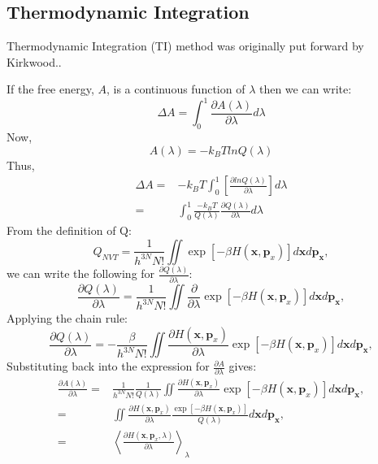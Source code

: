 \subsection{Thermodynamic Integration\label{Sec:FEM:TI}}
Thermodynamic Integration (TI) method was originally put forward by Kirkwood.\cite{KirkwoodJCP1935}. 
	
If the free energy, $A$, is a continuous function of $\lambda$ then we can write:
\begin{equation}
\Delta A = \int_{0}^{1} \frac{\partial{A(\lambda)}}{\partial{\lambda}} d\lambda
\label{Eq:deltaA1TI}
\end{equation} 
Now,
\begin{equation}
A(\lambda) = -k_{B}TlnQ(\lambda)
\label{Eq:Alambda}
\end{equation} 
Thus,
\begin{align}
\Delta A =& -k_{B}T\int_{0}^{1} \left[ \frac{\partial{lnQ(\lambda)}}{\partial{\lambda}} \right]d\lambda \\
=&\int_{0}^{1}\frac{-k_{B}T}{Q(\lambda)}\frac{\partial{Q(\lambda)}}{\partial{\lambda}}d\lambda
\label{Eq:deltaA2TI}
\end{align} 
From the definition of Q:
\begin{equation}
Q_{NVT} = \frac{1}{{h}^{3N}N!} \iint \exp[-\beta H(\textbf{x},\textbf{p}_{x})] d\textbf{x}d\textbf{p}_\textbf{x},
\label{Eq:PFTI}
\end{equation}
we can write the following for $\frac{\partial{Q(\lambda)}}{\partial{\lambda}}$:
\begin{equation}
\frac{\partial{Q(\lambda)}}{\partial{\lambda}} = \frac{1}{{h}^{3N}N!} \iint \frac{\partial}{\partial{\lambda}}\exp[-\beta H(\textbf{x},\textbf{p}_{x})] d\textbf{x}d\textbf{p}_\textbf{x},
\label{Eq:PPF}
\end{equation}
Applying the chain rule:
\begin{equation}
\frac{\partial{Q(\lambda)}}{\partial{\lambda}} = -\frac{\beta}{{h}^{3N}N!} \iint \frac{\partial{H(\textbf{x},\textbf{p}_{x})}}{\partial{\lambda}}\exp[-\beta H(\textbf{x},\textbf{p}_{x})] d\textbf{x}d\textbf{p}_\textbf{x},
\label{Eq:PPF2}
\end{equation}
Substituting back into the expression for $\frac{\partial{A}}{\partial{\lambda}}$ gives:
\begin{align}
\frac{\partial{A(\lambda)}}{\partial{\lambda}} =& \frac{1}{{h}^{3N}N!}\frac{1}{Q(\lambda)} \iint \frac{\partial{H(\textbf{x},\textbf{p}_{x})}}{\partial{\lambda}}\exp[-\beta H(\textbf{x},\textbf{p}_{x})] d\textbf{x}d\textbf{p}_\textbf{x}, \\
=& \iint \frac{\partial{H(\textbf{x},\textbf{p}_{x})}}{\partial{\lambda}}\frac{\exp[-\beta H(\textbf{x},\textbf{p}_{x})]}{Q(\lambda)} d\textbf{x}d\textbf{p}_\textbf{x}, \\
=& \left \langle \frac{\partial{H(\textbf{x},\textbf{p}_{x}, \lambda)}}{\partial{\lambda}} \right \rangle_{\lambda}
\label{Eq:PA2}
\end{align}
